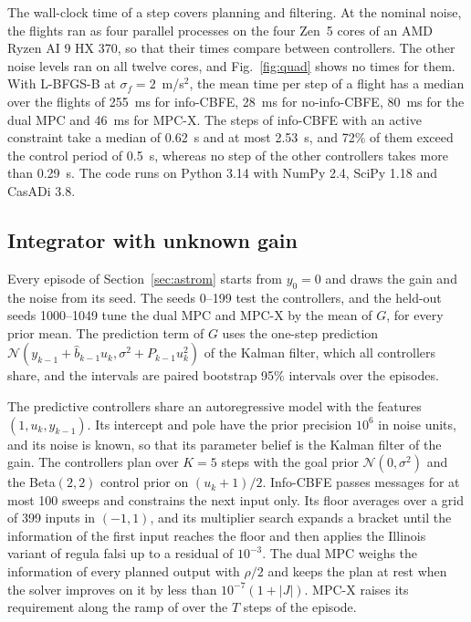 \documentclass{l4dc2027}
\def\cN{\mathcal{N}}
\begin{document}
The wall-clock time of a step covers planning and filtering. At the nominal noise, the flights ran as four parallel processes on the four Zen~5 cores of an AMD Ryzen AI 9 HX 370, so that their times compare between controllers. The other noise levels ran on all twelve cores, and Fig.~\ref{fig:quad} shows no times for them. With L-BFGS-B at $\sigma_f = 2$~m/s$^2$, the mean time per step of a flight has a median over the flights of 255~ms for info-CBFE, 28~ms for no-info-CBFE, 80~ms for the dual MPC and 46~ms for MPC-X. The steps of info-CBFE with an active constraint take a median of 0.62~s and at most 2.53~s, and 72\% of them exceed the control period of 0.5~s, whereas no step of the other controllers takes more than 0.29~s. The code runs on Python 3.14 with NumPy 2.4, SciPy 1.18 and CasADi 3.8.

\subsection{Integrator with unknown gain}\label{sec:integrator}

Every episode of Section~\ref{sec:astrom} starts from $y_0 = 0$ and draws the gain and the noise from its seed. The seeds 0--199 test the controllers, and the held-out seeds 1000--1049 tune the dual MPC and MPC-X by the mean of $G$, for every prior mean. The prediction term of $G$ uses the one-step prediction $\cN(y_{k-1} + \hat{b}_{k-1} u_k, \sigma^2 + P_{k-1} u_k^2)$ of the Kalman filter, which all controllers share, and the intervals are paired bootstrap 95\% intervals over the episodes.

The predictive controllers share an autoregressive model with the features $(1, u_k, y_{k-1})$. Its intercept and pole have the prior precision $10^6$ in noise units, and its noise is known, so that its parameter belief is the Kalman filter of the gain. The controllers plan over $K = 5$ steps with the goal prior $\cN(0, \sigma^2)$ and the Beta$(2, 2)$ control prior on $(u_k + 1)/2$. Info-CBFE passes messages for at most 100 sweeps and constrains the next input only. Its floor averages over a grid of 399 inputs in $(-1, 1)$, and its multiplier search expands a bracket until the information of the first input reaches the floor and then applies the Illinois variant of regula falsi up to a residual of $10^{-3}$. The dual MPC weighs the information of every planned output with $\rho/2$ and keeps the plan at rest when the solver improves on it by less than $10^{-7}(1 + |J|)$. MPC-X raises its requirement along the ramp of \citet{larsson2013model} over the $T$ steps of the episode.
\end{document}
